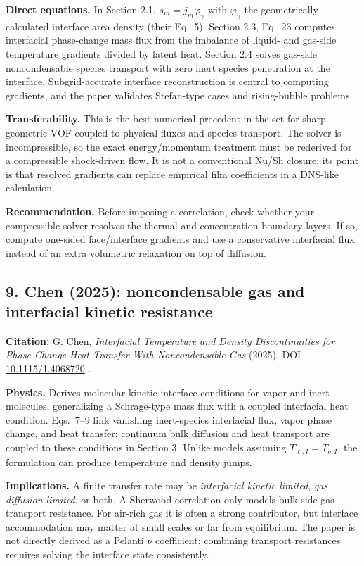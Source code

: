 \documentclass[11pt,letterpaper]{article}
\begin{document}
\textbf{Direct equations.} In Section 2.1, $s_m=j_m\varphi_\gamma$ with $\varphi_\gamma$ the geometrically calculated interface area density (their Eq.~5). Section 2.3, Eq.~23 computes interfacial phase-change mass flux from the imbalance of liquid- and gas-side temperature gradients divided by latent heat. Section 2.4 solves gas-side noncondensable species transport with zero inert species penetration at the interface. Subgrid-accurate interface reconstruction is central to computing gradients, and the paper validates Stefan-type cases and rising-bubble problems.

\textbf{Transferability.} This is the best numerical precedent in the set for sharp geometric VOF coupled to physical fluxes and species transport. The solver is incompressible, so the exact energy/momentum treatment must be rederived for a compressible shock-driven flow. It is not a conventional Nu/Sh closure; its point is that resolved gradients can replace empirical film coefficients in a DNS-like calculation.

\textbf{Recommendation.} Before imposing a correlation, check whether your compressible solver resolves the thermal and concentration boundary layers. If so, compute one-sided face/interface gradients and use a conservative interfacial flux instead of an extra volumetric relaxation on top of diffusion.

\subsection{9. Chen (2025): noncondensable gas and interfacial kinetic resistance}
\textbf{Citation:} G. Chen, \emph{Interfacial Temperature and Density Discontinuities for Phase-Change Heat Transfer With Noncondensable Gas} (2025), DOI \href{https://doi.org/10.1115/1.4068720}{10.1115/1.4068720} \cite{Chen2025}.

\textbf{Physics.} Derives molecular kinetic interface conditions for vapor and inert molecules, generalizing a Schrage-type mass flux with a coupled interfacial heat condition. Eqs.~7--9 link vanishing inert-species interfacial flux, vapor phase change, and heat transfer; continuum bulk diffusion and heat transport are coupled to these conditions in Section 3. Unlike models assuming $T_{\ell,I}=T_{g,I}$, the formulation can produce temperature and density jumps.

\textbf{Implications.} A finite transfer rate may be \emph{interfacial kinetic limited}, \emph{gas diffusion limited}, or both. A Sherwood correlation only models bulk-side gas transport resistance. For air-rich gas it is often a strong contributor, but interface accommodation may matter at small scales or far from equilibrium. The paper is not directly derived as a Pelanti $\nu$ coefficient; combining transport resistances requires solving the interface state consistently.
\end{document}
